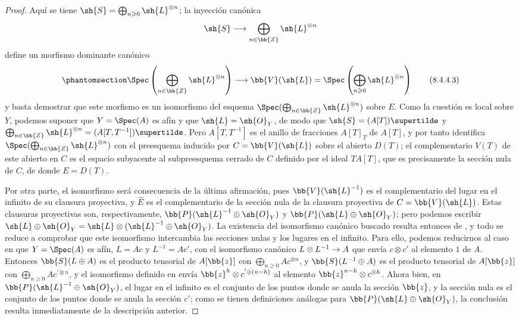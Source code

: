 \documentclass[oneside,10pt]{amsart}
\makeatletter
\renewcommand{\geq}{\geqslant}
\newcommand{\ega@arrow}[2]{\mathchoice{#1}{#2}{#2}{#2}}
\renewcommand{\to}{\ega@arrow{\longrightarrow}{\rightarrow}}
\newcommand{\oldpage}[2][]{\marginnote{\normalfont\footnotesize\textbf{#1}~|~#2}\ignorespaces}
\let\EGAOriginalLabel\label
\renewcommand{\label}[1]{\phantomsection\EGAOriginalLabel{#1}}
\newcommand*{\ega@labelnumber}[1]{\StrBehind{#1}{.}}
\newcommand{\eref}[1]{\hyperref[#1]{\normalfont{(\ega@labelnumber{#1})}}}
\makeatother
\begin{document}
\begin{proof}
Aquí se tiene $\sh{S}=\bigoplus_{n\geq0}\sh{L}^{\otimes n}$;
la inyección canónica
\[
  \sh{S} \to \bigoplus_{n\in\bb{Z}} \sh{L}^{\otimes n}
\]
define un morfismo dominante canónico
\[
\label{eq:2.8.4.4.3}
  \Spec\left(
    \bigoplus_{n\in\bb{Z}} \sh{L}^{\otimes n}
  \right)
  \to
  \bb{V}(\sh{L})
  =
  \Spec\left(
    \bigoplus_{n\geq0} \sh{L}^{\otimes n}
  \right)
\tag{8.4.4.3}
\]
y basta demostrar que este morfismo es un isomorfismo del esquema $\Spec(\bigoplus_{n\in\bb{Z}} \sh{L}^{\otimes n})$ sobre $E$.
Como la cuestión es local sobre $Y$, podemos suponer que $Y=\Spec(A)$ es afín
\oldpage[II]{169}
y que $\sh{L}=\sh{O}_Y$, de modo que $\sh{S}=(A[T])\supertilde$ y $\bigoplus_{n\in\bb{Z}}\sh{L}^{\otimes n} = (A[T,T^{-1}])\supertilde$.
Pero $A[T,T^{-1}]$ es el anillo de fracciones $A[T]_T$ de $A[T]$, y por tanto \eref{eq:2.8.4.4.3} identifica $\Spec(\bigoplus_{n\in\bb{Z}}\sh{L}^{\otimes n})$ con el preesquema inducido por $C=\bb{V}(\sh{L})$ sobre el abierto $D(T)$;
el complementario $V(T)$ de este abierto en $C$ es el espacio subyacente al subpreesquema cerrado de $C$ definido por el ideal $TA[T]$, que es precisamente la sección nula de $C$, de donde $E=D(T)$.

Por otra parte, el isomorfismo \eref{eq:2.8.4.4.2} será consecuencia de la última afirmación, pues $\bb{V}(\sh{L}^{-1})$ es el complementario del lugar en el infinito de su clausura proyectiva, y $\widehat{E}$ es el complementario de la sección nula de la clausura proyectiva de $C=\bb{V}(\sh{L})$.
Estas clausuras proyectivas son, respectivamente, $\bb{P}(\sh{L}^{-1}\oplus\sh{O}_Y)$ y $\bb{P}(\sh{L}\oplus\sh{O}_Y)$;
pero podemos escribir $\sh{L}\oplus\sh{O}_Y = \sh{L}\otimes(\sh{L}^{-1}\oplus\sh{O}_Y)$.
La existencia del isomorfismo canónico buscado resulta entonces de , y todo se reduce a comprobar que este isomorfismo intercambia las secciones nulas y los lugares en el infinito.
Para ello, podemos reducirnos al caso en que $Y=\Spec(A)$ es afín, $L=Ac$ y $L^{-1}=Ac'$, con el isomorfismo canónico $L\otimes L^{-1}\to A$ que envía $c\otimes c'$ al elemento $1$ de $A$.
Entonces $\bb{S}(L\oplus A)$ es el producto tensorial de $A[\bb{z}]$ con $\bigoplus_{n\geq0}Ac^{\otimes n}$, y $\bb{S}(L^{-1}\oplus A)$ es el producto tensorial de $A[\bb{z}]$ con $\bigoplus_{n\geq0}Ac^{'\otimes n}$, y el isomorfismo definido en  envía $\bb{z}^h\otimes c^{'\otimes(n-h)}$ al elemento $\bb{z}^{n-h}\otimes c^{\otimes h}$.
Ahora bien, en $\bb{P}(\sh{L}^{-1}\oplus\sh{O}_Y)$, el lugar en el infinito es el conjunto de los puntos donde se anula la sección $\bb{z}$, y la sección nula es el conjunto de los puntos donde se anula la sección $c'$;
como se tienen definiciones análogas para $\bb{P}(\sh{L}\oplus\sh{O}_Y)$, la conclusión resulta inmediatamente de la descripción anterior.
\end{proof}
\end{document}
